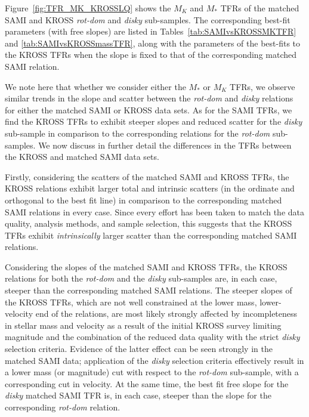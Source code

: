 \documentclass[a4paper,fleqn,usenatbib]{mnras}
\begin{document}
{Figure~\ref{fig:TFR_MK_KROSSLQ} shows the $M_{K}$ and $M_{*}$ TFRs of the matched SAMI and KROSS \textit{rot-dom} and \textit{disky} sub-samples. The corresponding best-fit parameters (with free slopes) are listed in Tables~\ref{tab:SAMIvsKROSSMKTFR} and \ref{tab:SAMIvsKROSSmassTFR}, along with the parameters of the best-fits to the KROSS TFRs when the slope is fixed to that of the corresponding matched SAMI relation.

We note here that whether we consider either the $M_{*}$ or $M_{K}$ TFRs, we observe similar trends in the slope and scatter between the \textit{rot-dom} and \textit{disky} relations for either the matched SAMI or KROSS data sets. As for the SAMI TFRs, we find the KROSS TFRs to exhibit steeper slopes and reduced scatter for the \textit{disky} sub-sample in comparison to the corresponding relations for the \textit{rot-dom} sub-samples. We now discuss in further detail the differences in the TFRs between the KROSS and matched SAMI data sets.    

Firstly, considering the scatters of the matched SAMI and KROSS TFRs, the KROSS relations exhibit larger total and intrinsic scatters (in the ordinate and orthogonal to the best fit line) in comparison to the corresponding matched SAMI relations in every case. Since every effort has been taken to match the data quality, analysis methods, and sample selection, this suggests that the KROSS TFRs exhibit {\it intrinsically} larger scatter than the corresponding matched SAMI relations.   

Considering the slopes of the matched SAMI and KROSS TFRs, the KROSS relations for both the \textit{rot-dom} and the \textit{disky} sub-samples are, in each case, steeper than the corresponding matched SAMI relations. The steeper slopes of the KROSS TFRs, which are not well constrained at the lower mass, lower-velocity end of the relations, are most likely strongly affected by incompleteness in stellar mass and velocity as a result of the initial KROSS survey limiting magnitude and the combination of the reduced data quality with the strict \textit{disky} selection criteria. Evidence of the latter effect can be seen strongly in the matched SAMI data; application of the \textit{disky} selection criteria effectively result in a lower mass (or magnitude) cut with respect to the \textit{rot-dom} sub-sample, with a corresponding cut in velocity. At the same time, the best fit free slope for the \textit{disky} matched SAMI TFR is, in each case, steeper than the slope for the corresponding \textit{rot-dom} relation. 

}
\end{document}
